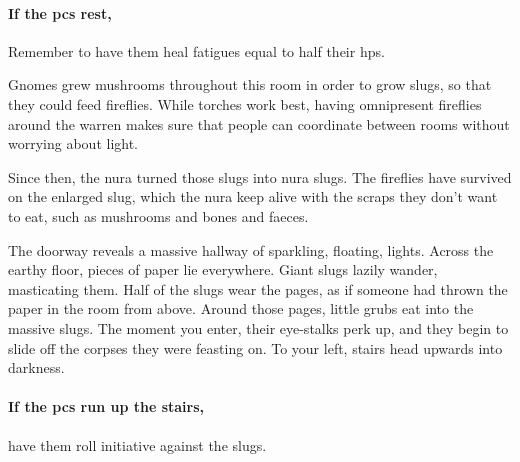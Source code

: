 \begin{multicols}{2}
{  \paragraph{If the \glspl{pc} rest,}
  Remember to have them heal \glspl{fatigue} equal to half their \glspl{hp}.
}{}



\begin{exampletext}

Gnomes grew mushrooms throughout this room in order to grow slugs, so that they could feed fireflies.
While torches work best, having omnipresent fireflies around the warren makes sure that people can coordinate between rooms without worrying about light.

Since then, the nura turned those slugs into nura slugs.
The fireflies have survived on the enlarged slug, which the nura keep alive with the scraps they don't want to eat, such as mushrooms and bones and faeces.

\end{exampletext}

\begin{boxtext}

  The doorway reveals a massive hallway of sparkling, floating, lights.
  Across the earthy floor, pieces of paper lie everywhere.
  Giant slugs lazily wander, masticating them.
  Half of the slugs wear the pages, as if someone had thrown the paper in the room from above.
  Around those pages, little grubs eat into the massive slugs.
  The moment you enter, their eye-stalks perk up, and they begin to slide off the corpses they were feasting on.
  To your left, stairs head upwards into darkness.

\end{boxtext}

\paragraph{If the \glspl{pc} run up the stairs,}
have them roll initiative against the slugs.


\end{multicols}
